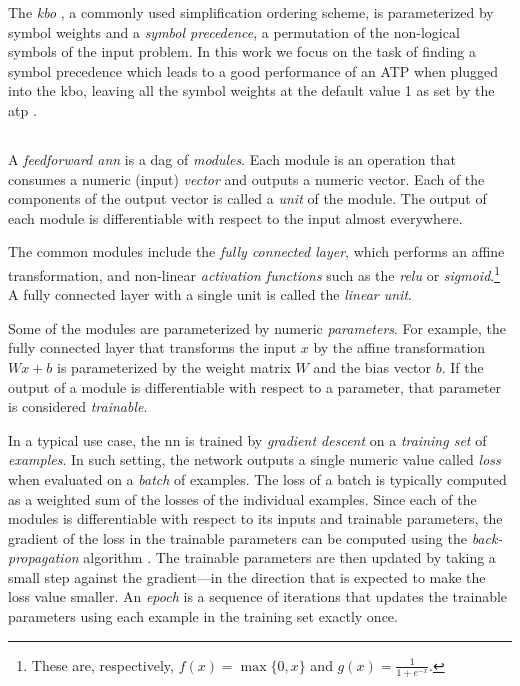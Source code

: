 The \emph{\acrfull{kbo}} \cite{Knuth1983}, a commonly used simplification ordering scheme,
is parameterized by symbol weights and a \emph{symbol precedence},
a permutation of the non-logical symbols of the input problem.
In this work we focus on the task of finding a symbol precedence which
leads to a good performance of an ATP
when plugged into the \gls{kbo},
leaving all the symbol weights at the default 
value 1 as set by the \gls{atp} \Vampire{}.

\subsection{}

A \emph{feedforward \acrlong{ann}} \cite{DBLP:books/daglib/0040158} is a \acrlong{dag} of \emph{modules}.
Each module is an operation that consumes a numeric (input) \emph{vector} and outputs a numeric vector.
Each of the components of the output vector is called a \emph{unit} of the module.
The output of each module is differentiable with respect to the input almost everywhere.

The common modules include
the \emph{fully connected layer}, which performs an affine transformation,
and non-linear \emph{activation functions} such as the \emph{\gls{relu}} or \emph{sigmoid}.\footnote{
These are, respectively, $f(x) = \max\{0,x\}$ and $g(x) = \frac{1}{1+e^{-x}}$.}
A fully connected layer with a single unit is called the \emph{linear unit}.

Some of the modules are parameterized by numeric \emph{parameters}.
For example, the fully connected layer that transforms the input $x$ by the affine transformation $Wx + b$
is parameterized by the weight matrix $W$ and the bias vector $b$.
If the output of a module is differentiable with respect to a parameter,
that parameter is considered \emph{trainable}.

In a typical use case, the \acrlong{nn} is trained by \emph{gradient descent} on a \emph{training set} of \emph{examples}.
In such setting, the network outputs a single numeric value called \emph{loss} when evaluated on a \emph{batch} of examples.
The loss of a batch is typically computed as a weighted sum of the losses of the individual examples.
Since each of the modules is differentiable with respect to its inputs and trainable parameters,
the gradient of the loss in the trainable parameters
can be computed using the \emph{back-propagation} algorithm \cite{DBLP:books/daglib/0040158}.
The trainable parameters are then updated by taking a small step
against the gradient---in the direction that is expected to make the loss value smaller.
An \emph{epoch} is a sequence of iterations that updates the trainable parameters
using each example in the training set exactly once.

